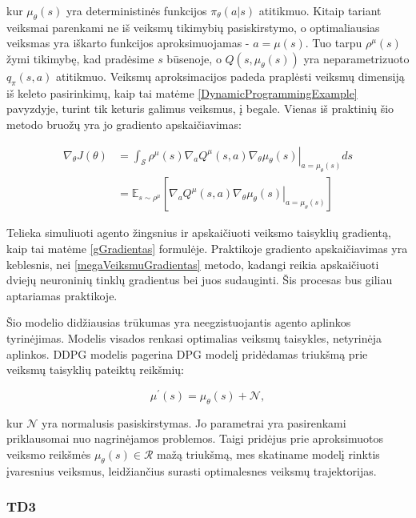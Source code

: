 \documentclass[a4paper, 12pt]{article}
\begin{document}
kur $\mu_{\theta}(s)$ yra deterministinės funkcijos $\pi_\theta(a|s)$ atitikmuo. Kitaip tariant veiksmai parenkami ne iš veiksmų tikimybių pasiskirstymo, o optimaliausias veiksmas yra iškarto funkcijos aproksimuojamas - $a = \mu(s)$. Tuo tarpu $\rho^{\mu}(s)$ žymi tikimybę, kad pradėsime $s$ būsenoje, o $Q\left(s, \mu_{\theta}(s)\right)$ yra neparametrizuoto $q_{\pi}(s, a)$ atitikmuo. Veiksmų aproksimacijos padeda praplėsti veiksmų dimensiją iš keleto pasirinkimų, kaip tai matėme \ref{DynamicProgrammingExample} pavyzdyje, turint tik keturis galimus veiksmus, į begale. Vienas iš praktinių šio metodo bruožų yra jo gradiento apskaičiavimas:

\begin{equation}
\begin{aligned}
\nabla_{\theta} J(\theta) &=\left.\int_{\mathcal{S}} \rho^{\mu}(s) \nabla_{a} Q^{\mu}(s, a) \nabla_{\theta} \mu_{\theta}(s)\right|_{a=\mu_{\theta}(s)} d s \\
&=\mathbb{E}_{s \sim \rho^{\mu}}\left[\left.\nabla_{a} Q^{\mu}(s, a) \nabla_{\theta} \mu_{\theta}(s)\right|_{a=\mu_{\theta}(s)}\right]
\label{keistasGradientas}
\end{aligned}
\end{equation}

Telieka simuliuoti agento žingsnius ir apskaičiuoti veiksmo taisyklių gradientą, kaip tai matėme \ref{gGradientas} formulėje. Praktikoje gradiento apskaičiavimas yra keblesnis, nei \ref{megaVeiksmuGradientas} metodo, kadangi reikia apskaičiuoti dviejų neuroninių tinklų gradientus bei juos sudauginti. Šis procesas bus giliau aptariamas praktikoje. 

Šio modelio didžiausias trūkumas yra neegzistuojantis agento aplinkos tyrinėjimas. Modelis visados renkasi optimalias veiksmų taisykles, netyrinėja aplinkos. DDPG\cite{DDPG} modelis pagerina DPG modelį pridėdamas triukšmą prie veiksmų taisyklių pateiktų reikšmių:

\begin{equation}
\mu^{\prime}(s)=\mu_{\theta}(s)+\mathcal{N},
\end{equation}

kur $\mathcal{N}$ yra normalusis pasiskirstymas. Jo parametrai yra pasirenkami priklausomai nuo nagrinėjamos problemos. Taigi pridėjus prie aproksimuotos veiksmo reikšmės $\mu_{\theta}(s) \in \mathcal{R}$ mažą triukšmą, mes skatiname modelį rinktis įvaresnius veiksmus, leidžiančius surasti optimalesnes veiksmų trajektorijas.

\subsubsection{TD3}
\end{document}
